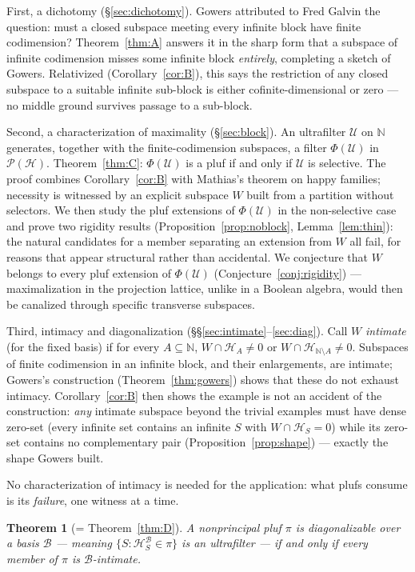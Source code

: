 \documentclass[11pt,reqno]{amsart}
\newtheorem{theorem}{Theorem}[section]
\theoremstyle{definition}
\newcommand{\HH}{\mathcal{H}}
\newcommand{\PP}{\mathcal{P}}
\newcommand{\N}{\mathbb{N}}
\newcommand{\U}{\mathcal{U}}
\newcommand{\pluf}{\pi}
\begin{document}
First, a dichotomy (\S\ref{sec:dichotomy}). Gowers attributed to Fred Galvin the
question: must a closed subspace meeting every infinite block have finite codimension?
Theorem~\ref{thm:A} answers it in the sharp form that a subspace of infinite
codimension misses some infinite block \emph{entirely}, completing a sketch of
Gowers.
Relativized (Corollary~\ref{cor:B}), this says the restriction of any closed subspace to
a suitable infinite sub-block is either cofinite-dimensional or zero --- no middle
ground survives passage to a sub-block.

Second, a characterization of maximality (\S\ref{sec:block}). An ultrafilter $\U$ on
$\N$ generates, together with the finite-codimension subspaces, a filter $\Phi(\U)$ in
$\PP(\HH)$. Theorem~\ref{thm:C}: $\Phi(\U)$ is a pluf if and only if $\U$ is selective.
The proof combines Corollary~\ref{cor:B} with Mathias's theorem on happy families;
necessity is witnessed by an explicit subspace $W$ built from a partition without
selectors. We then study the pluf extensions of $\Phi(\U)$ in the non-selective case
and prove two rigidity results (Proposition~\ref{prop:noblock},
Lemma~\ref{lem:thin}): the natural candidates for a member separating an extension
from $W$ all fail, for reasons that appear structural rather than accidental. We
conjecture that $W$ belongs to every pluf extension of $\Phi(\U)$
(Conjecture~\ref{conj:rigidity}) --- maximalization in the projection lattice, unlike
in a Boolean algebra, would then be canalized through specific transverse subspaces.

Third, intimacy and diagonalization (\S\S\ref{sec:intimate}--\ref{sec:diag}). Call $W$
\emph{intimate} (for the fixed basis) if for every $A\subseteq\N$, $W\cap\HH_A\neq0$ or
$W\cap\HH_{\N\setminus A}\neq0$. Subspaces of finite codimension in an infinite block,
and their enlargements, are intimate; Gowers's construction
(Theorem~\ref{thm:gowers}) shows that these do not exhaust intimacy. Corollary~\ref{cor:B} then shows the
example is not an accident of the construction: \emph{any} intimate subspace beyond the
trivial examples must have dense zero-set (every infinite set contains an infinite $S$
with $W\cap\HH_S=0$) while its zero-set contains no complementary pair
(Proposition~\ref{prop:shape}) --- exactly the shape Gowers built.

No characterization of intimacy is needed for the application: what plufs consume is
its \emph{failure}, one witness at a time.

\begin{theorem}[= Theorem~\ref{thm:D}]
A nonprincipal pluf $\pluf$ is diagonalizable over a basis $\mathcal B$ --- meaning
$\{S:\HH_S^{\mathcal B}\in\pluf\}$ is an ultrafilter --- if and only if every member of
$\pluf$ is $\mathcal B$-intimate.
\end{theorem}
\end{document}

